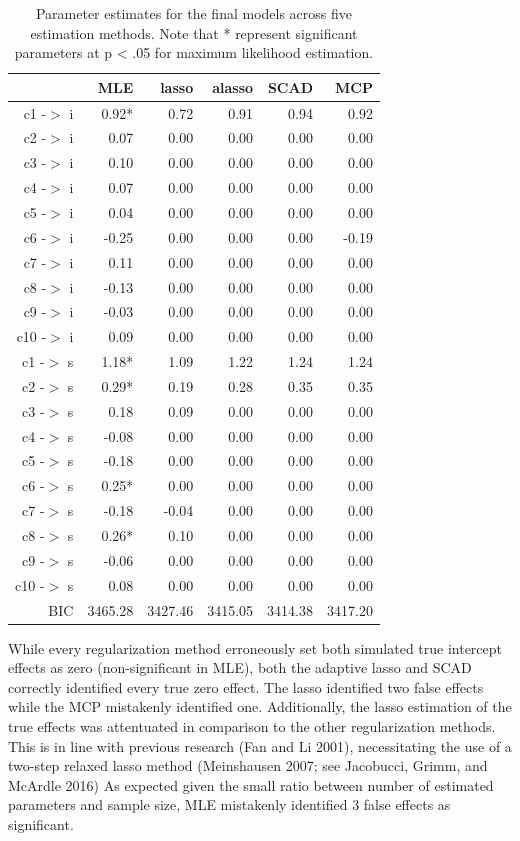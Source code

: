 \begin{table}[ht]
\centering
\begin{tabular}{rrrrrr}
  \hline
 & MLE & lasso & alasso & SCAD & MCP \\ 
  \hline
c1 -$>$ i & 0.92* & 0.72 & 0.91 & 0.94 & 0.92 \\ 
  c2 -$>$ i & 0.07 & 0.00 & 0.00 & 0.00 & 0.00 \\ 
  c3 -$>$ i & 0.10 & 0.00 & 0.00 & 0.00 & 0.00 \\ 
  c4 -$>$ i & 0.07 & 0.00 & 0.00 & 0.00 & 0.00 \\ 
  c5 -$>$ i & 0.04 & 0.00 & 0.00 & 0.00 & 0.00 \\ 
  c6 -$>$ i & -0.25 & 0.00 & 0.00 & 0.00 & -0.19 \\ 
  c7 -$>$ i & 0.11 & 0.00 & 0.00 & 0.00 & 0.00 \\ 
  c8 -$>$ i & -0.13 & 0.00 & 0.00 & 0.00 & 0.00 \\ 
  c9 -$>$ i & -0.03 & 0.00 & 0.00 & 0.00 & 0.00 \\ 
  c10 -$>$ i & 0.09 & 0.00 & 0.00 & 0.00 & 0.00 \\ 
  c1 -$>$ s & 1.18* & 1.09 & 1.22 & 1.24 & 1.24 \\ 
  c2 -$>$ s & 0.29* & 0.19 & 0.28 & 0.35 & 0.35 \\ 
  c3 -$>$ s & 0.18 & 0.09 & 0.00 & 0.00 & 0.00 \\ 
  c4 -$>$ s & -0.08 & 0.00 & 0.00 & 0.00 & 0.00 \\ 
  c5 -$>$ s & -0.18 & 0.00 & 0.00 & 0.00 & 0.00 \\ 
  c6 -$>$ s & 0.25* & 0.00 & 0.00 & 0.00 & 0.00 \\ 
  c7 -$>$ s & -0.18 & -0.04 & 0.00 & 0.00 & 0.00 \\ 
  c8 -$>$ s & 0.26* & 0.10 & 0.00 & 0.00 & 0.00 \\ 
  c9 -$>$ s & -0.06 & 0.00 & 0.00 & 0.00 & 0.00 \\ 
  c10 -$>$ s & 0.08 & 0.00 & 0.00 & 0.00 & 0.00 \\ 
  BIC & 3465.28 & 3427.46 & 3415.05 & 3414.38 & 3417.20 \\ 
   \hline
\end{tabular}
\caption{Parameter estimates for the final models across five estimation methods. Note that * represent significant parameters at p < .05 for maximum likelihood estimation.}
\end{table}

While every regularization method erroneously set both simulated true
intercept effects as zero (non-significant in MLE), both the adaptive
lasso and SCAD correctly identified every true zero effect. The lasso
identified two false effects while the MCP mistakenly identified one.
Additionally, the lasso estimation of the true effects was attentuated
in comparison to the other regularization methods. This is in line with
previous research (Fan and Li 2001), necessitating the use of a two-step
relaxed lasso method (Meinshausen 2007; see Jacobucci, Grimm, and
McArdle 2016) As expected given the small ratio between number of
estimated parameters and sample size, MLE mistakenly identified 3 false
effects as significant.


